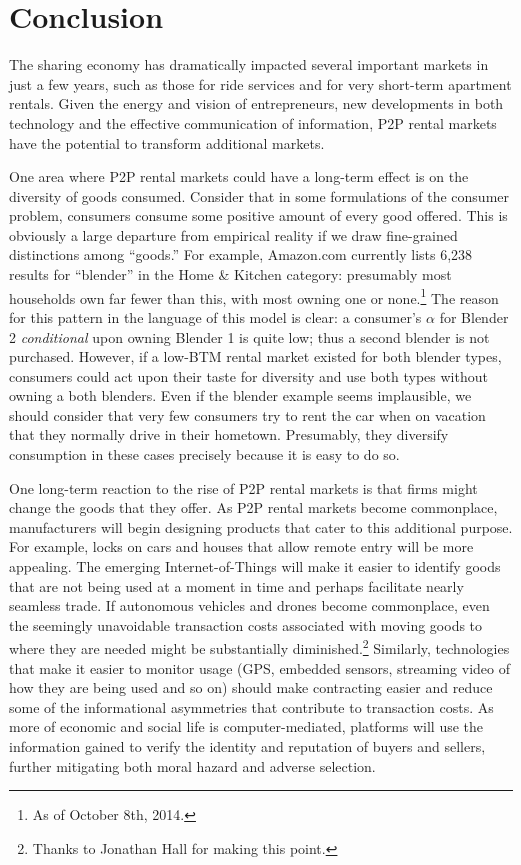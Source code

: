 \documentclass[11pt]{article}
\begin{document}
\section{Conclusion} 

The sharing economy has dramatically impacted several important markets in just a few years, such as those for ride services and for very short-term apartment rentals.
Given the energy and vision of entrepreneurs, new developments in both technology and the effective communication of information, P2P rental markets have the potential to transform additional markets.

One area where P2P rental markets could have a long-term effect is on the diversity of goods consumed. 
Consider that in some formulations of the consumer problem, consumers consume some positive amount of every good offered.
This is obviously a large departure from empirical reality if we draw fine-grained distinctions among ``goods.'' 
For example, Amazon.com currently lists 6,238 results for ``blender'' in the Home \& Kitchen category: 
presumably most households own far fewer than this, with most owning one or none.\footnote{As of October 8th, 2014.}
The reason for this pattern in the language of this model is clear: 
a consumer's $\alpha$ for Blender 2 \emph{conditional} upon owning Blender 1 is quite low;
thus a second blender is not purchased.
However, if a low-BTM rental market existed for both blender types, consumers could act upon their taste for diversity and use both types without owning a both blenders. 
Even if the blender example seems implausible, we should consider that very few consumers try to rent the car when on vacation that they normally drive in their hometown. 
Presumably, they diversify consumption in these cases precisely because it is easy to do so. 

One long-term reaction to the rise of P2P rental markets is that firms might change the goods that they offer. 
As P2P rental markets become commonplace, manufacturers will begin designing products that cater to this additional purpose. 
For example, locks on cars and houses that allow remote entry will be more appealing. 
The emerging Internet-of-Things will make it easier to identify goods that are not being used at a moment in time and perhaps facilitate nearly seamless trade.
If autonomous vehicles and drones become commonplace, even the seemingly unavoidable transaction costs associated with moving goods to where they are needed might be substantially diminished.\footnote{
  Thanks to Jonathan Hall for making this point.
}
Similarly, technologies that make it easier to monitor usage (GPS, embedded sensors, streaming video of how they are being used and so on) should make contracting easier and reduce some of the informational asymmetries that contribute to transaction costs. 
As more of economic and social life is computer-mediated, platforms will use the information gained to verify the identity and reputation of buyers and sellers, further mitigating both moral hazard and adverse selection.  
\end{document}
